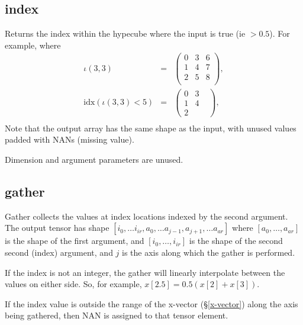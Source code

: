 \subsection{index}\label{Operation:index}

Returns the index within the hypecube where the input is true (ie
$>0.5$). For example, where
\begin{eqnarray*}
  \iota(3,3) &=& \left(\begin{array}{ccc}
                         0 & 3 & 6 \\
                         1 & 4 & 7 \\
                         2 & 5 & 8 \\
                       \end{array}\right),\\
  \mathrm{idx}(\iota(3,3)<5) &=&
                                 \left(\begin{array}{ccc}
                                         0 & 3 &\\
                                         1 & 4 &\\
                                         2 & &
                                       \end{array}\right),\\
\end{eqnarray*}
Note that the output array has the same shape as the input, with
unused values padded with NANs (missing value).

Dimension and argument parameters are unused.


\subsection{gather}\label{Operation:gather}

Gather collects the values at index locations indexed by the second
argument. The output tensor has shape
$[i_0, \ldots i_{ir}, a_0,\ldots a_{j-1},a_{j+1},\ldots a_{ar}]$ where
$[a_0,\ldots,a_{ar}]$ is the shape of the first argument, and
$[i_0,\ldots,i_{ir}]$ is the shape of the second second (index)
argument, and $j$ is the axis along which the gather is performed.

If the index is not an integer, the gather will linearly interpolate
between the values on either side. So, for example,
$x[2.5] = 0.5 (x[2]+x[3])$.

If the index value is outside the range of the x-vector
(\S\ref{x-vector}) along the axis being gathered, then NAN is assigned
to that tensor element.

